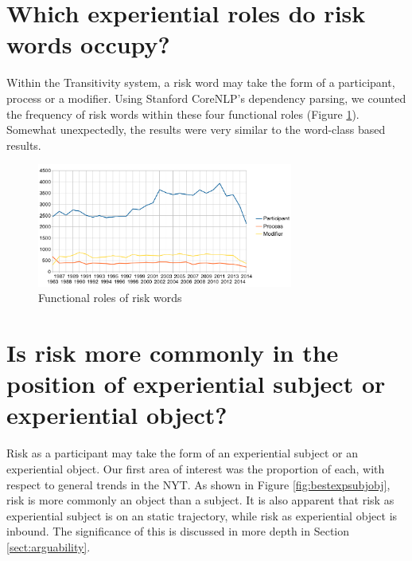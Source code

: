
	\section{Which experiential roles do risk words occupy?} 
	\FloatBarrier

	Within the Transitivity system, a risk word may take the form of a participant, process or a modifier. Using Stanford CoreNLP's dependency parsing, we counted the frequency of risk words within these four functional roles (Figure \ref{fig:funcrole}). Somewhat unexpectedly, the results were very similar to the word-class based results.

			\begin{figure}[htb!]
			\centering
			\includegraphics[width=0.75\textwidth]{../images/funcrole.png}
			\caption{Functional roles of risk words}
			\label{fig:funcrole}
			\end{figure}

		

		\section{Is risk more commonly in the position of experiential subject or experiential object?} 
		\FloatBarrier

		Risk as a participant may take the form of an experiential subject or an experiential object. Our first area of interest was the proportion of each, with respect to general trends in the NYT. As shown in Figure \ref{fig:bestexpsubjobj}, risk is more commonly an object than a subject. It is also apparent that risk as experiential subject is on an static trajectory, while risk as experiential object is inbound. The significance of this is discussed in more depth in Section \ref{sect:arguability}.


